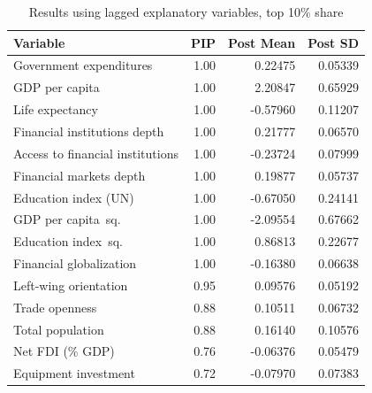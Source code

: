   \begin{table}[ht!]    
    \caption{Results using lagged explanatory variables, top 10\% share}\label{chA:tab5}
    \centering
    \footnotesize
    \begin{tabular}{lrrr}
      \toprule
    Variable & PIP & Post Mean & Post SD \\
      \midrule
      Government expenditures & 1.00 & 0.22475 & 0.05339 \\
      GDP per capita & 1.00 & 2.20847 & 0.65929 \\
      Life expectancy & 1.00 & -0.57960 & 0.11207 \\ 
  Financial institutions depth & 1.00 & 0.21777 & 0.06570 \\
  Access to financial institutions & 1.00 & -0.23724 & 0.07999 \\
  Financial markets depth & 1.00 & 0.19877 & 0.05737 \\ 
  Education index (UN) & 1.00 & -0.67050 & 0.24141 \\
  GDP per capita\ sq. & 1.00 & -2.09554 & 0.67662 \\
  Education index\ sq. & 1.00 & 0.86813 & 0.22677 \\ 
  Financial globalization & 1.00 & -0.16380 & 0.06638 \\
  Left-wing orientation & 0.95 & 0.09576 & 0.05192 \\ 
  Trade openness & 0.88 & 0.10511 & 0.06732 \\
  Total population & 0.88 & 0.16140 & 0.10576 \\ 
  Net FDI (\% GDP) & 0.76 & -0.06376 & 0.05479 \\
  Equipment investment & 0.72 & -0.07970 & 0.07383 \\  
      \bottomrule
    \end{tabular}
    \end{table}

